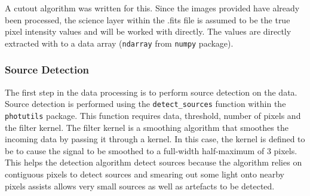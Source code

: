 \documentclass[a4paper,fleqn,usenatbib]{mnras}
\begin{document}
A cutout algorithm was written for this. Since the images provided have already been processed, the science layer within the .fits file is assumed to be the true pixel intensity values and will be worked with directly. The values are directly extracted with to a data array (\texttt{ndarray} from \texttt{numpy} package).

\subsubsection{Source Detection}
The first step in the data processing is to perform source detection on the data. Source detection is performed using the  \texttt{detect\_sources} function within the \texttt{photutils} package. This function requires data, threshold, number of pixels and the filter kernel. The filter kernel is a smoothing algorithm that smoothes the incoming data by passing it through a kernel. In this case, the kernel is defined to be to cause the signal to be smoothed to a full-width half-maximum of 3 pixels. This helps the detection algorithm detect sources because the algorithm relies on contiguous pixels to detect sources and smearing out some light onto nearby pixels assists allows very small sources as well as artefacts to be detected.
\end{document}
